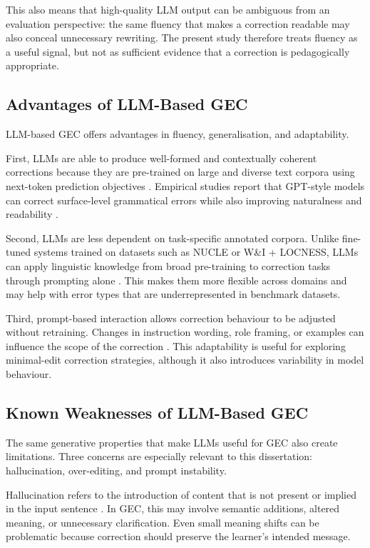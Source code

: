 This also means that high-quality LLM output can be ambiguous from an evaluation perspective: the same fluency that makes a correction readable may also conceal unnecessary rewriting. The present study therefore treats fluency as a useful signal, but not as sufficient evidence that a correction is pedagogically appropriate.

\subsection{Advantages of LLM-Based GEC}

LLM-based GEC offers advantages in fluency, generalisation, and adaptability.

First, LLMs are able to produce well-formed and contextually coherent corrections because they are pre-trained on large and diverse text corpora using next-token prediction objectives \cite{NEURIPS2020_1457c0d6}. Empirical studies report that GPT-style models can correct surface-level grammatical errors while also improving naturalness and readability \cite{loem2023exploringeffectivenessgpt3grammatical}.

Second, LLMs are less dependent on task-specific annotated corpora. Unlike fine-tuned systems trained on datasets such as NUCLE or W\&I + LOCNESS, LLMs can apply linguistic knowledge from broad pre-training to correction tasks through prompting alone \cite{ng-etal-2014-conll,bryant-etal-2019-bea,NEURIPS2020_1457c0d6}. This makes them more flexible across domains and may help with error types that are underrepresented in benchmark datasets.

Third, prompt-based interaction allows correction behaviour to be adjusted without retraining. Changes in instruction wording, role framing, or examples can influence the scope of the correction \cite{liu2023pretrain}. This adaptability is useful for exploring minimal-edit correction strategies, although it also introduces variability in model behaviour.

\subsection{Known Weaknesses of LLM-Based GEC}

The same generative properties that make LLMs useful for GEC also create limitations. Three concerns are especially relevant to this dissertation: hallucination, over-editing, and prompt instability.

Hallucination refers to the introduction of content that is not present or implied in the input sentence \cite{maynez2020faithfulness}. In GEC, this may involve semantic additions, altered meaning, or unnecessary clarification. Even small meaning shifts can be problematic because correction should preserve the learner's intended message.

